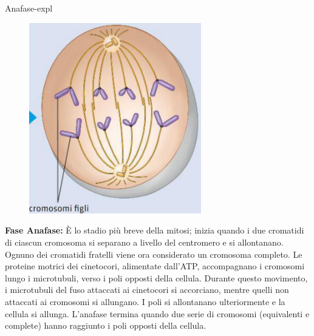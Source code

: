 \documentclass[preview]{standalone}
\begin{document}
\begin{snippet}{Anafase-expl}
    \setlength{\intextsep}{0pt}%
    \begin{figure}
        \includegraphics[width=7.5cm]{./resources/anafase.jpg}
        \vspace{-1cm}
    \end{figure}

    \textbf{Fase Anafase:}
    È lo stadio più breve della mitosi; inizia quando i due cromatidi di ciascun cromosoma si
    separano a livello del centromero e si allontanano. Ognuno dei cromatidi fratelli viene ora
    considerato un cromosoma completo. Le proteine motrici dei cinetocori, alimentate dall'ATP,
    accompagnano i cromosomi lungo i microtubuli, verso i poli opposti della cellula. Durante
    questo movimento, i microtubuli del fuso attaccati ai cinetocori si accorciano, mentre quelli
    non attaccati ai cromosomi si allungano. I poli si allontanano ulteriormente e la cellula si
    allunga. L'anafase termina quando due serie di cromosomi (equivalenti e complete) hanno
    raggiunto i poli opposti della cellula.
    \wrapfill
\end{snippet}
\end{document}
